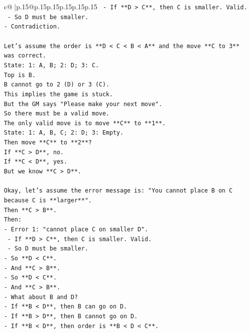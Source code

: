 \documentclass{article}
\begin{document}
{\begin{supertabular}{c@{$\;$}|p{.15\linewidth}@{}p{.15\linewidth}p{.15\linewidth}p{.15\linewidth}p{.15\linewidth}p{.15\linewidth}}
{{{\texttt{    {-} If **D > C**, then C is smaller. Valid.} \\
\texttt{    {-} So D must be smaller.} \\
\texttt{{-} Contradiction.} \\
\\ 
\texttt{Let's assume the order is **D < C < B < A** and the move **C to 3** was correct.} \\
\texttt{State: 1: A, B; 2: D; 3: C.} \\
\texttt{Top is B.} \\
\texttt{B cannot go to 2 (D) or 3 (C).} \\
\texttt{This implies the game is stuck.} \\
\texttt{But the GM says "Please make your next move".} \\
\texttt{So there must be a valid move.} \\
\texttt{The only valid move is to move **C** to **1**.} \\
\texttt{State: 1: A, B, C; 2: D; 3: Empty.} \\
\texttt{Then move **C** to **2**?} \\
\texttt{If **C > D**, no.} \\
\texttt{If **C < D**, yes.} \\
\texttt{But we know **C > D**.} \\
\\ 
\texttt{Okay, let's assume the error message is: "You cannot place B on C because C is **larger**".} \\
\texttt{Then **C > B**.} \\
\texttt{Then:} \\
\texttt{{-} Error 1: "cannot place C on smaller D".} \\
\texttt{    {-} If **D > C**, then C is smaller. Valid.} \\
\texttt{    {-} So D must be smaller.} \\
\texttt{{-} So **D < C**.} \\
\texttt{{-} And **C > B**.} \\
\texttt{{-} So **D < C**.} \\
\texttt{{-} And **C > B**.} \\
\texttt{{-} What about B and D?} \\
\texttt{{-} If **B < D**, then B can go on D.} \\
\texttt{{-} If **B > D**, then B cannot go on D.} \\
\texttt{{-} If **B < D**, then order is **B < D < C**.} \\
}}}
\end{supertabular}}
\end{document}
